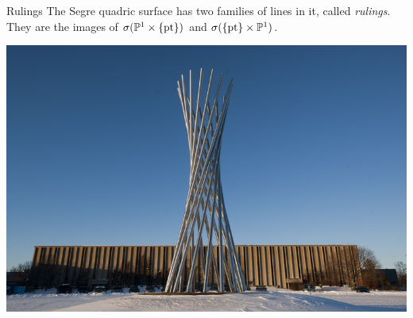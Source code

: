 \begin{frame}
    \begin{block}{Rulings}
    The Segre quadric surface has two families of lines in it, called \emph{rulings}. They are the images of $\sigma(\mathbb{P}^{1} \times \{ \text{pt} \} )$ and $\sigma( \{ \text{pt} \} \times \mathbb{P}^{1})$.
    \end{block}

    \begin{center}
        \includegraphics[height=0.35\textwidth]{resources/tractricious.jpg}
    \end{center}

\end{frame}

